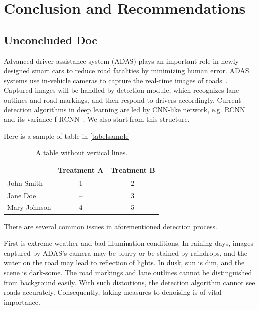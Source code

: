 
\chapter{Conclusion and Recommendations}
\begin{spacing}{1.5}
\setlength{\parskip}{0.3in}

\section{Unconcluded Doc}

Advanced-driver-assistance system (ADAS) plays an important role in newly designed smart cars to reduce road fatalities by minimizing human error. ADAS systems use in-vehicle cameras to capture the real-time images of roads~\cite{ziebinski2016survey}. Captured images will be handled by detection module, which recognizes lane outlines and road markings, and then respond to drivers accordingly. Current detection algorithms in deep learning are led by CNN-like network, e.g. RCNN~\cite{girshick2014rich} and its variance f-RCNN~\cite{girshick2015fast}. We also start from this structure.

Here is a sample of table in \autoref{tabelsample}

\begin{table}[ht]
\centering
\caption{A table without vertical lines.}
\label{tabelsample}
\begin{tabular}[t]{lcc}
\hline
&Treatment A&Treatment B\\
\hline
John Smith&1&2\\
Jane Doe&--&3\\
Mary Johnson&4&5\\
\hline
\end{tabular}
\end{table}%

There are several common issues in aforementioned detection process. 

First is extreme weather and bad illumination conditions. In raining days, images captured by ADAS’s camera may be blurry or be stained by raindrops, and the water on the road may lead to reflection of lights. In dusk, sun is dim, and the scene is dark-some. The road markings and lane outlines cannot be distinguished from background easily. With such distortions, the detection algorithm cannot see roads accurately. Consequently, taking measures to denoising is of vital importance. 


\end{spacing}
